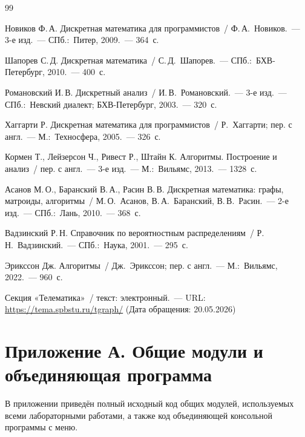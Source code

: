 \documentclass[a4paper,final]{article}
\begin{document}
\clearpage
{}
\begin{thebibliography}{99}

	Новиков Ф.\,А. Дискретная математика для программистов~/ Ф.\,А.~Новиков.~---
	3-е изд.~--- СПб.:~Питер, 2009.~--- 364~с.

	Шапорев С.\,Д. Дискретная математика~/ С.\,Д.~Шапорев.~---
	СПб.:~БХВ-Петербург, 2010.~--- 400~с.

	Романовский И.\,В. Дискретный анализ~/ И.\,В.~Романовский.~---
	3-е изд.~--- СПб.:~Невский диалект; БХВ-Петербург, 2003.~--- 320~с.

	Хаггарти Р. Дискретная математика для программистов~/ Р.~Хаггарти; пер. с англ.~---
	М.:~Техносфера, 2005.~--- 326~с.

	Кормен Т., Лейзерсон Ч., Ривест Р., Штайн К. Алгоритмы. Построение и анализ~/ пер. с англ.~---
	3-е изд.~--- М.:~Вильямс, 2013.~--- 1328~с.

	Асанов М.\,О., Баранский В.\,А., Расин В.\,В. Дискретная математика: графы, матроиды, алгоритмы~/ М.\,О.~Асанов, В.\,А.~Баранский, В.\,В.~Расин.~---
	2-е изд.~--- СПб.:~Лань, 2010.~--- 368~с.

	Вадзинский Р.\,Н. Справочник по вероятностным распределениям~/ Р.\,Н.~Вадзинский.~---
	СПб.:~Наука, 2001.~--- 295~с.

	Эрикссон Дж. Алгоритмы~/ Дж.~Эрикссон; пер. с англ.~---
	М.:~Вильямс, 2022.~--- 960~с.

	Секция «Телематика»~/ текст: электронный.~---
	URL: \url{https://tema.spbstu.ru/tgraph/}
	(Дата обращения: 20.05.2026)

\end{thebibliography}


\clearpage
\section*{Приложение А. Общие модули и объединяющая программа}

В приложении приведён полный исходный код общих модулей, используемых всеми лабораторными работами, а также код объединяющей консольной программы с меню.


\end{document}
